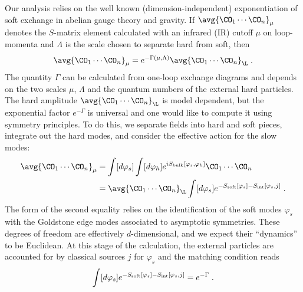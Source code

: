 \documentclass[11pt]{article}
\def\G{{\Gamma}}
\begin{document}
Our analysis relies on the well known (dimension-independent) exponentiation of soft exchange in abelian gauge theory and gravity. If $\avg{ \CO_1 \cdots \CO_n }_\mu$ denotes the $S$-matrix element calculated with an infrared (IR) cutoff $\mu$ on loop-momenta and $\Lambda$ is the scale chosen to separate hard from soft, then 
\begin{equation}\notag
\avg{ \CO_1 \cdots \CO_n }_\mu  = e^{ - \G(\mu,\Lambda) } \avg{ \CO_1 \cdots \CO_n }_\L \; . 
\end{equation}
The quantity $\Gamma$ can be calculated from one-loop exchange diagrams and depends on the two scales $\mu$, $\Lambda$ and the quantum numbers of the external hard particles. The hard amplitude $\avg{ \CO_1 \cdots \CO_n }_\L$ is model dependent, but the exponential factor $e^{ - \G }$ is universal and one would like to compute it using symmetry principles. To do this, we separate fields into hard and soft pieces, integrate out the hard modes, and consider the effective action for the slow modes:
\begin{equation}\notag
\begin{split}
\avg{ \CO_1 \cdots \CO_n }_\mu &= \int [d \varphi_{s}  ] \int [ d \varphi_{h} ] e^{ i S_{\text{bulk}} [ \varphi_s , \varphi_h ] } \CO_1 \cdots \CO_n \\
&= \avg{ \CO_1 \cdots \CO_n }_\L \int  [d \varphi_{s} ] e^{ - S_{\text{soft}} [ \varphi_s ] - S_{\text{int}} [ \varphi_s , j ]  }  \;  .
\end{split}
\end{equation}
The form of the second equality relies on the identification of the soft modes $\varphi_s$ with the Goldstone edge modes associated to asymptotic symmetries. These degrees of freedom are effectively $d$-dimensional, and we expect their ``dynamics'' to be Euclidean. At this stage of the calculation, the external particles are accounted for by classical sources $j$  for $\varphi_s$ and  the matching condition reads
\begin{equation} \notag
\begin{split}
 \int  [d \varphi_{s} ] e^{ - S_{\text{soft}} [ \varphi_s ] - S_{\text{int}} [ \varphi_s , j ]  } = e^{ - \G}  \; .
\end{split}
\end{equation}
\end{document}
